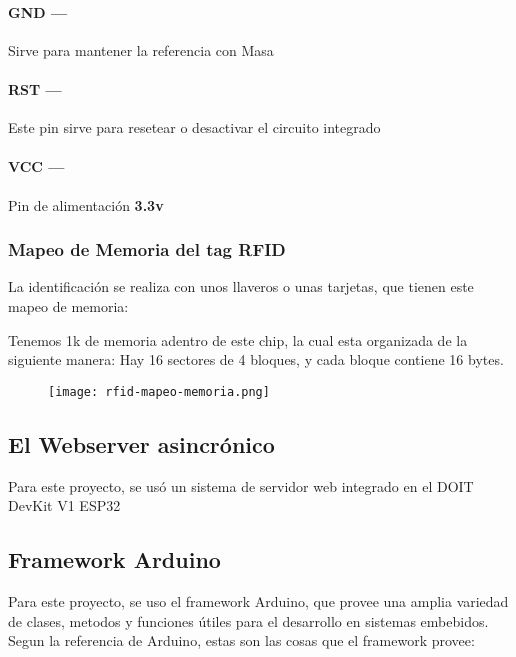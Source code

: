 \documentclass[../informe_krapp.tex]{subfiles}
\begin{document}
\paragraph{GND ---}
Sirve para mantener la referencia con Masa

\paragraph{RST ---}
Este pin sirve para resetear o desactivar el circuito integrado

\paragraph{VCC ---}
Pin de alimentación \textbf{3.3v}

\clearpage
\subsubsection{Mapeo de Memoria del tag RFID}
La identificación se realiza con unos llaveros o unas tarjetas,
que tienen este mapeo de memoria:

Tenemos 1k de memoria adentro de este chip, la cual esta organizada de la
siguiente manera: Hay 16 sectores de 4 bloques, y cada bloque contiene 16 bytes.

\begin{figure}[H]
	\centering
	\texttt{[image: rfid-mapeo-memoria.png]}
\end{figure}

\subsection{El Webserver asincrónico}
Para este proyecto, se usó un sistema de servidor web integrado en el DOIT DevKit V1 ESP32

\subsection{Framework Arduino}
Para este proyecto, se uso el framework Arduino, que provee una amplia variedad de
clases, metodos y funciones útiles para el desarrollo en sistemas embebidos.
Segun la referencia de Arduino\cite{arduino_reference}, estas son las cosas que
el framework provee:
\end{document}
